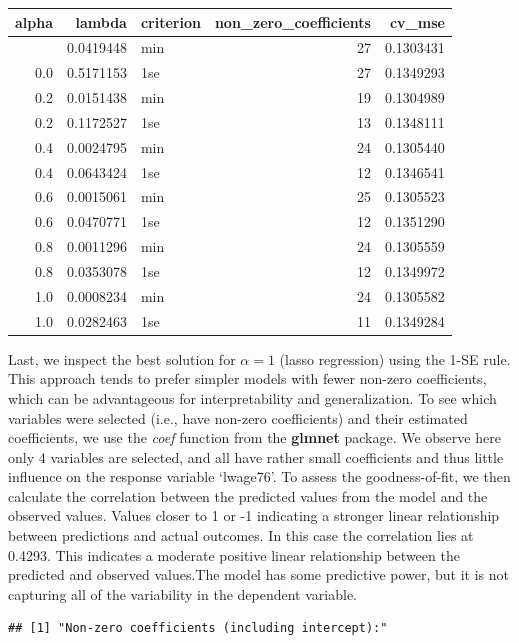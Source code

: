 \documentclass[
]{article}
\begin{document}
\begin{longtable}[]{@{}rrlrr@{}}
\toprule\noalign{}
alpha & lambda & criterion & non\_zero\_coefficients & cv\_mse \\
\midrule\noalign{}
\endhead
\bottomrule\noalign{}
\endlastfoot
0.0 & 0.0419448 & min & 27 & 0.1303431 \\
0.0 & 0.5171153 & 1se & 27 & 0.1349293 \\
0.2 & 0.0151438 & min & 19 & 0.1304989 \\
0.2 & 0.1172527 & 1se & 13 & 0.1348111 \\
0.4 & 0.0024795 & min & 24 & 0.1305440 \\
0.4 & 0.0643424 & 1se & 12 & 0.1346541 \\
0.6 & 0.0015061 & min & 25 & 0.1305523 \\
0.6 & 0.0470771 & 1se & 12 & 0.1351290 \\
0.8 & 0.0011296 & min & 24 & 0.1305559 \\
0.8 & 0.0353078 & 1se & 12 & 0.1349972 \\
1.0 & 0.0008234 & min & 24 & 0.1305582 \\
1.0 & 0.0282463 & 1se & 11 & 0.1349284 \\
\end{longtable}

Last, we inspect the best solution for \(\alpha = 1\) (lasso regression)
using the 1-SE rule. This approach tends to prefer simpler models with
fewer non-zero coefficients, which can be advantageous for
interpretability and generalization. To see which variables were
selected (i.e., have non-zero coefficients) and their estimated
coefficients, we use the \textit{coef} function from the \textbf{glmnet}
package. We observe here only 4 variables are selected, and all have
rather small coefficients and thus little influence on the response
variable `lwage76'. To assess the goodness-of-fit, we then calculate the
correlation between the predicted values from the model and the observed
values. Values closer to 1 or -1 indicating a stronger linear
relationship between predictions and actual outcomes. In this case the
correlation lies at 0.4293. This indicates a moderate positive linear
relationship between the predicted and observed values.The model has
some predictive power, but it is not capturing all of the variability in
the dependent variable.

\begin{verbatim}
## [1] "Non-zero coefficients (including intercept):"
\end{verbatim}
\end{document}
